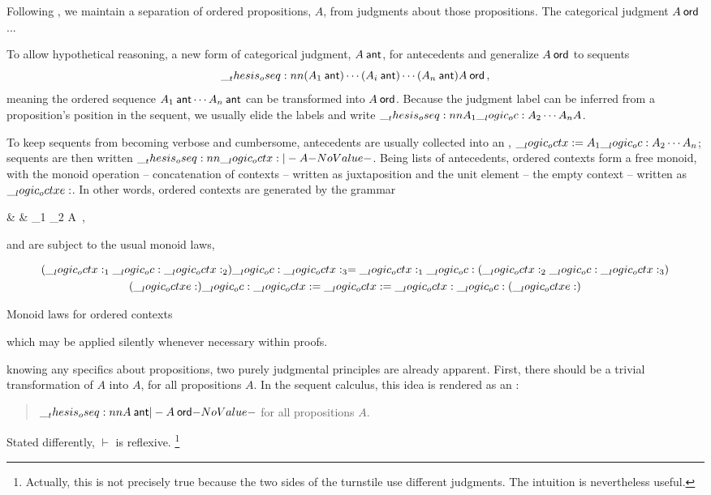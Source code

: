 Following \citeauthor{Martin-Lof:NJPL96}\autocite{Martin-Lof:NJPL96}, we maintain a separation of ordered propositions, $A$, from judgments about those propositions.
  The categorical judgment $A \ord$ ... 

To allow hypothetical reasoning, a new form of categorical judgment, $A \ant$, for antecedents and generalize $A \ord$ to sequents
  \begin{equation*}
    \oseq{(A_1 \ant) \dotsm (A_i \ant) \dotsm (A_n \ant) |- A \ord}
    \,,
  \end{equation*}
  meaning the ordered sequence $A_1 \ant \dotsm A_n \ant$ can be transformed into $A \ord$.
  Because the judgment label can be inferred from a proposition's position in the sequent, we usually elide the labels and write $\oseq{A_1 \oc A_2 \dotsm A_n |- A}$.

To keep sequents from becoming verbose and cumbersome, antecedents are usually collected into an , $\__logic_octx: = A_1 \__logic_oc: A_2 \dotsm A_n$; sequents are then written $\oseq{\octx |- A}$.
% 
Being lists of antecedents, ordered contexts form a free monoid, with the monoid operation -- concatenation of contexts -- written as juxtaposition and the unit element -- the empty context -- written as $\__logic_octxe:$.
In other words, ordered contexts are generated by the grammar
\begin{syntax*}
  & \octx & \octx_1 \oc \octx_2 \mid \octxe \mid A \ant
  \,,
\end{syntax*}
and are subject to the usual monoid laws,
\begin{marginfigure}
  \begin{gather*}
    (\__logic_octx:_1 \__logic_oc: \__logic_octx:_2) \__logic_oc: \__logic_octx:_3 = \__logic_octx:_1 \__logic_oc: (\__logic_octx:_2 \__logic_oc: \__logic_octx:_3) \\
    (\__logic_octxe:) \__logic_oc: \__logic_octx: = \__logic_octx: = \__logic_octx: \__logic_oc: (\__logic_octxe:)
  \end{gather*}
  \caption{Monoid laws for ordered contexts}
\end{marginfigure}%
which may be applied silently whenever necessary within proofs.


 knowing any specifics about propositions, two purely judgmental principles are already apparent.
%
First, there should be a trivial transformation of $A$ into $A$, for all propositions $A$.
In the sequent calculus, this idea is rendered as an :
\begin{quotation}
  $\oseq{A \ant |- A \ord}$ for all propositions $A$.
\end{quotation}
Stated differently, $\vdash$ is reflexive.%
\footnote{Actually, this is not precisely true because the two sides of the turnstile use different judgments.
The intuition is nevertheless useful.}

